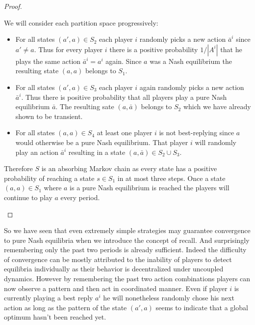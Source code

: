 \documentclass[a4paper]{article}
\theoremstyle{plain}
\theoremstyle{remark}
\begin{document}
\begin{proof}
\begin{description}
			We will consider each partition space progressively:
			\begin{itemize}
				\item For all states $(a', a) \in S_2$ each player $i$ randomly picks a new action $\bar{a}^i$ since $a' \neq a$.
					Thus for every player $i$ there is a positive probability $1/|A^i|$ that he plays the same action
					$\bar{a}^i = a^i$ again. Since $a$ was a Nash equilibrium the resulting state $(a, a)$ belongs to $S_1$.
		
				\item For all states $(a', a) \in S_3$ each player $i$ again randomly picks a new action $\bar{a}^i$.
					Thus there is positive probability that all players play a pure Nash equilibrium $\bar{a}$.
					The resulting sate $(a, \bar{a})$ belongs to $S_2$ which we have already shown to be transient.
					
				\item For all states $(a, a) \in S_4$ at least one player $i$ is not best-replying since $a$ would otherwise
					be a pure Nash equilibrium. That player $i$ will randomly play an action $\bar{a}^i$ resulting in a state
					$(a, \bar{a}) \in S_2 \cup S_3$.
			\end{itemize}
%				
			Therefore $S$ is an absorbing Markov chain as every state has a positive probability of reaching a state $s \in S_1$
			in at most three steps. Once a state $(a, a) \in S_1$ where $a$ is a pure Nash equilibrium is reached the players will
			continue to play $a$ every period.
	\end{description}
\end{proof}
So we have seen that even extremely simple strategies may guarantee convergence to pure Nash equilibria when we introduce
the concept of recall. And surprisingly remembering only the past two periods is already sufficient.
Indeed the difficulty of convergence can be mostly attributed to the inability of players to detect equilibria individually as
their behavior is decentralized under uncoupled dynamics.
However by remembering the past two action combinations players can now observe a pattern and then act in coordinated
manner. Even if player $i$ is currently playing a best reply $a^i$ he will nonetheless randomly chose his next action 
as long as the pattern of the state $(a', a)$ seems to indicate that a global optimum hasn't been reached yet.
\end{document}
